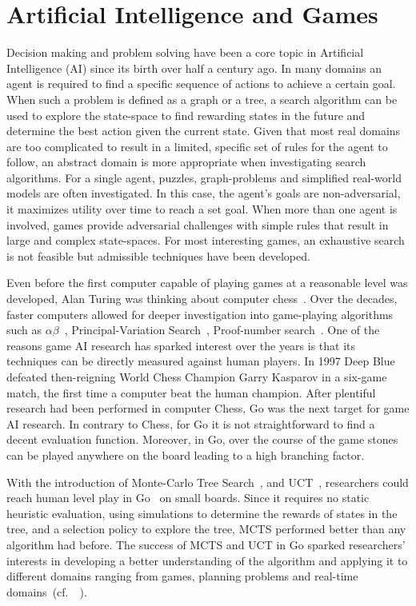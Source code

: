 \documentclass{kecsmstr}
\newcommand{\cf}{{cf.}~}
\begin{document}
\section{Artificial Intelligence and Games}
Decision making and problem solving have been a core topic in Artificial Intelligence (AI) since its birth over half a century ago. In many domains an agent is required to find a specific sequence of actions to achieve a certain goal. When such a problem is defined as a graph or a tree, a search algorithm can be used to explore the state-space to find rewarding states in the future and determine the best action given the current state.
Given that most real domains are too complicated to result in a limited, specific set of rules for the agent to follow, an abstract domain is more appropriate when investigating search algorithms. For a single agent, puzzles, graph-problems and simplified real-world models are often investigated. In this case, the agent's goals are non-adversarial, it maximizes utility over time to reach a set goal. When more than one agent is involved, games provide adversarial challenges with simple rules that result in large and complex state-spaces. For most interesting games, an exhaustive search is not feasible but admissible techniques have been developed.

Even before the first computer capable of playing games at a reasonable level was developed, Alan Turing was thinking about computer chess~. Over the decades, faster computers allowed for deeper investigation into game-playing algorithms such as $\alpha\beta$~, Principal-Variation Search~, Proof-number search~. One of the reasons game AI research has sparked interest over the years is that its techniques can be directly measured against human players. In 1997 {\sc Deep Blue}~ defeated then-reigning World Chess Champion Garry Kasparov in a six-game match, the first time a computer beat the human champion. After plentiful research had been performed in computer Chess, Go was the next target for game AI research. In contrary to Chess, for Go it is not straightforward to find a decent evaluation function. Moreover, in Go, over the course of the game stones can be played anywhere on the board leading to a high branching factor.

With the introduction of Monte-Carlo Tree Search~, and UCT~, researchers could reach human level play in Go~ on small boards. Since it requires no static heuristic evaluation, using simulations to determine the rewards of states in the tree, and a selection policy to explore the tree, MCTS performed better than any algorithm had before. The success of MCTS and UCT in Go sparked researchers' interests in developing a better understanding of the algorithm and applying it to different domains ranging from games, planning problems and real-time domains~(\cf~).
\newpage
\end{document}
